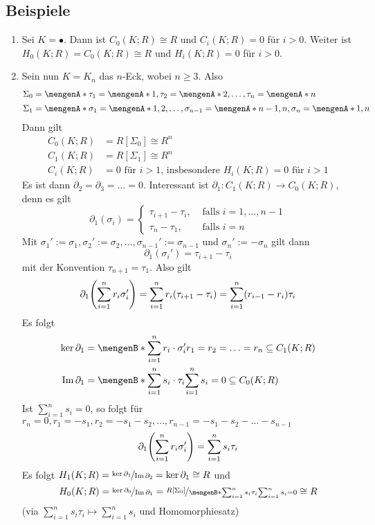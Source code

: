 \subsection[Beispiele für Homologiemoduln]{Beispiele} %
\label{sub:311}
\begin{enumerate}[(1)]
	\item Sei $K= \bullet$. Dann ist $C_0(K;R) \cong R$ und $C_i(K;R) = 0$ für $i>0$. Weiter ist $H_0(K;R) = C_0(K;R) \cong R$ und $H_i(K;R) =0$ für $i>0$.
	\item Sein nun $K=K_n$ das $n$-Eck, wobei $n \ge 3$.  Also
	\begin{align*}
		\Sigma_0 &= \set{\tau_1=\set{1}, \tau_2=\set{2}, \ldots , \tau_n = \set{n} \rule{0cm}{0.9em}} \\
 		\Sigma_1 &= \set{\sigma_1 = \set{1,2}, \ldots , \sigma_{n-1} = \set{n-1, n}, \sigma_n=\set{1,n} \rule{0cm}{0.9em}} 
	\end{align*}
	Dann gilt
	\begin{align*}
		C_0(K;R) &= R[\Sigma_0] \cong R^{n} \\
		C_1(K;R) &= R[\Sigma_1] \cong R^{n} \\
		C_i(K;R) &= 0 \text{ für $i>1$, insbesondere } H_i(K;R) = 0 \text{ für } i>1
	\end{align*}
	Es ist dann $\partial_2 = \partial_3 = \ldots  = 0$. Interessant ist $\partial_1 \colon C_1(K;R) \to C_0(K;R)$, denn es gilt
	\[
		\partial_1(\sigma_i) = \begin{cases}
			\tau_{i+1} - \tau_i, &\text{ falls }i=1, \ldots ,n-1\\
			\tau_n - \tau_1 , &\text{ falls } i=n
		\end{cases}
	\]
	Mit $\sigma_1' := \sigma_1, \sigma_2' := \sigma_2, \ldots , \sigma_{n-1}' := \sigma_{n-1}$ und $ \sigma_n' := - \sigma_n$ gilt dann
	\[
		\partial_1 (\sigma_i') = \tau_{i+1} - \tau_i
	\]
	mit der Konvention $\tau_{n+1} = \tau_1$. Also gilt
	\begin{align*}
		\partial_1 \enbrace*{\sum_{i=1}^{n} r_i \sigma_i' } = \sum_{i=1}^{n} r_i \enbrace*{\tau_{i+1}- \tau_i} = \sum_{i=1}^{n} (r_{i-1} - r_i) \tau_i  
	\end{align*}
	Es folgt
	\begin{align*}
		\ker \partial_1 &= \set[\sum_{i=1}^{n} r_i \cdot \sigma_i']{r_1=r_2= \ldots =r_n} \subseteq C_1(K;R) \\
		\im \partial_1 &= \set[\sum_{i=1}^{n} s_i \cdot \tau_i]{\sum_{i=1}^{n} s_i =0} \subseteq C_0(K;R)
	\end{align*}
	Ist $\sum_{i=1}^{n} s_i =0$, so folgt für $r_n=0, r_1 = -s_1, r_2=-s_1 -s_2, \ldots , r_{n-1} = -s_1 - s_2 - \ldots - s_{n-1}$
	\[
		\partial_1 \enbrace*{\sum_{i=1}^{n} r_i \sigma_i'} = \sum_{i=1}^{n} s_i \tau_i 
	\]
	Es folgt $ %
	H_1(K;R) = \nicefrac{\ker \partial_1}{\im \partial_2} = \ker \partial_1 \cong R %
	$ und 
	\[
		H_0(K;R) = \nicefrac{\ker \partial_0}{\im \partial_1} = \nicefrac{R[\Sigma_0]}{ \set[\sum_{i=1}^{n} s_i \tau_i]{\sum_{i=1}^{n} s_i =0} } \cong R 
	\]
	(via $\sum_{i=1}^{n} s_i \tau_i \longmapsto \sum_{i=1}^{n} s_i$ und Homomorphiesatz)
\end{enumerate}
